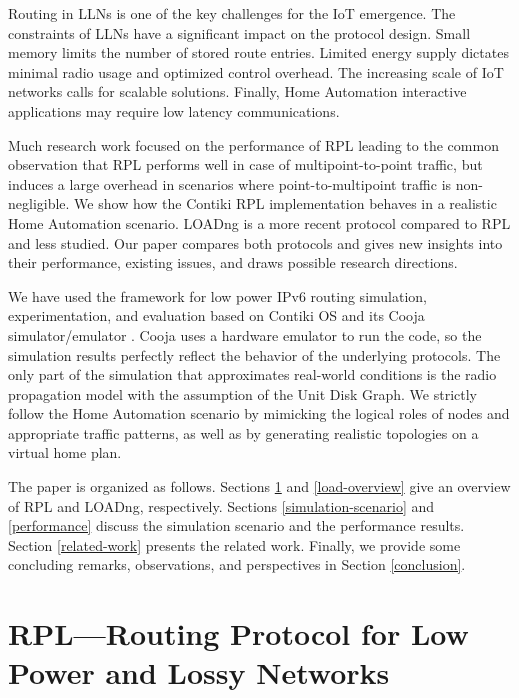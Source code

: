 \documentclass[conference,10pt,a4paper]{IEEEtran}
\begin{document}
Routing in LLNs is one of the key challenges for the IoT emergence. 
The constraints of LLNs have a significant impact on the protocol design. 
Small memory limits the number of stored route entries. Limited energy
supply dictates minimal radio usage and optimized control overhead. The
increasing scale of  IoT networks calls for scalable solutions. 
Finally, Home Automation interactive applications may require low latency
communications. 

Much research work focused on the performance of RPL \cite{rpl-performance-draft, rpl-tiny, rpl-two-cases-studies, rpl-performance} leading
to the common observation that RPL performs well in case of
multipoint-to-point traffic, but induces a large overhead in scenarios where point-to-multipoint traffic is
non-negligible. We show how the Contiki RPL implementation behaves in a realistic
Home Automation scenario. 
LOADng is a more recent protocol compared to RPL and less studied. 
Our paper compares both protocols and gives new insights into their performance,
existing issues, and draws possible research directions.

We have used the framework for low power IPv6
routing simulation, experimentation, and evaluation based on Contiki OS and its
Cooja simulator/emulator \cite{contiki-framework}. 
Cooja uses a hardware emulator to run the code, so the simulation results
perfectly reflect the behavior of the underlying protocols.
The only part of the simulation that approximates real-world conditions is the
radio propagation model with the assumption of the Unit Disk Graph. 
We
strictly follow the Home Automation scenario \cite{routingreq-home} by mimicking the logical roles
of nodes and appropriate traffic patterns, as well as by generating realistic
topologies on a virtual home plan.

The paper is organized as follows. Sections \ref{rpl-overview} and \ref{load-overview} give an
overview of RPL and LOADng, respectively. 
Sections \ref{simulation-scenario} and \ref{performance} discuss the simulation
scenario and the performance results. Section \ref{related-work} presents the
related work. 
Finally, we provide some concluding
remarks, observations, and perspectives in Section \ref{conclusion}.

\section{RPL---Routing Protocol for Low Power and Lossy Networks}
\label{rpl-overview}
\end{document}
